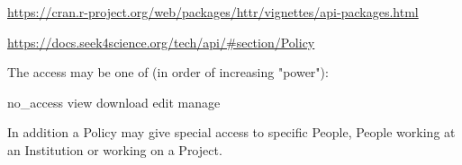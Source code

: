 \begin{knitrout}
\begin{kframe}
\begin{alltt}
    \hlstd{,}  \hlstd{=} 
    \hlstd{,} \hlstd{=}
    \hlstd{,} \hlstd{(}\hlstd{)}
    \hlstd{))}
     \hlkwb{<-} \hlstd{(}\hlstd{(}\hlopt{$}\hlopt{/}\hlopt{^}\hlstd{,}\hlstd{)}
     \hlkwb{<-}  \hlstd{)}
    \hlstd{\}}  \hlstd{\{}
     \hlkwb{<-} \hlstd{(} 
    \hlstd{\}}
    \hlopt{$}\hlopt{$}
         \hlstd{,} \hlstd{(fht[}\hlstd{],}\hlstd{)}
         \hlopt{$}
\hlstd{\}}
\hlstd{\}}
\end{alltt}
\end{kframe}
\end{knitrout}



\url{https://cran.r-project.org/web/packages/httr/vignettes/api-packages.html}

\url{https://docs.seek4science.org/tech/api/#section/Policy}

The access may be one of (in order of increasing "power"):

    no_access
    view
    download
    edit
    manage

In addition a Policy may give special access to specific People, People working at an Institution or working on a Project.

